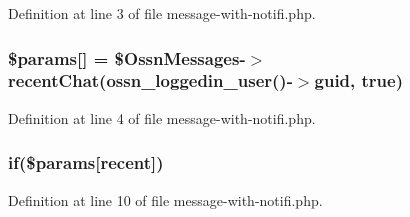 Definition at line 3 of file message-\/with-\/notifi.\+php.

\subsubsection[{\texorpdfstring{\$params}{$params}}]{\setlength{\rightskip}{0pt plus 5cm}\$params\mbox{[}\textquotesingle{}\mbox{]} = \${\bf Ossn\+Messages}-\/$>$recent\+Chat({\bf ossn\+\_\+loggedin\+\_\+user}()-\/$>$guid, true)}\hypertarget{message-with-notifi_8php_ac699a1602e8805cf6fea0b288aef815a}{}\label{message-with-notifi_8php_ac699a1602e8805cf6fea0b288aef815a}


Definition at line 4 of file message-\/with-\/notifi.\+php.

\subsubsection[{\texorpdfstring{if}{if}}]{\setlength{\rightskip}{0pt plus 5cm}if(\$params\mbox{[}\textquotesingle{}recent\textquotesingle{}\mbox{]})}\hypertarget{message-with-notifi_8php_a8310ac66d015bc317b9322bc2bcd45db}{}\label{message-with-notifi_8php_a8310ac66d015bc317b9322bc2bcd45db}


Definition at line 10 of file message-\/with-\/notifi.\+php.

